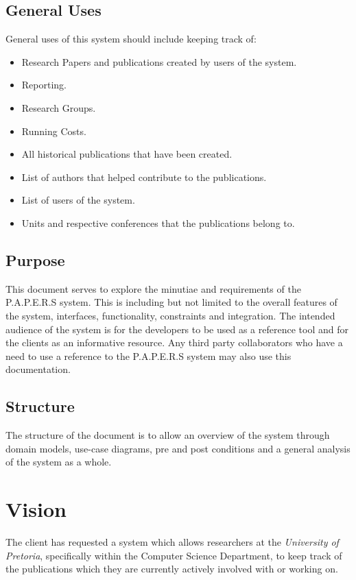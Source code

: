 \documentclass{article}
\begin{document}
	\subsection{General Uses}\label{subsec:generaluses}
		General uses of this system should include keeping track of:
            \begin{itemize}  
            
                \item Research Papers and publications created by users of the system.
                \item Reporting.
                \item Research Groups.
                \item Running Costs.
                \item All historical publications that have been created.
                \item List of authors that helped contribute to the publications.
                \item List of users of the system.
                \item Units and respective conferences that the publications belong to.
            \end{itemize}
		\subsection{Purpose}\label{subsec:purpose}
			This document serves to explore the minutiae and requirements of the P.A.P.E.R.S system. This is including but not limited to the overall features of the system, interfaces, functionality, constraints and integration. The intended audience of the system is for the developers to be used as a reference tool and for the clients as an informative resource. Any third party collaborators who have a need to use a reference to the P.A.P.E.R.S system may also use this documentation.
		\subsection{Structure}\label{subsec:structure}
			The structure of the document is to allow an overview of the system through domain models, use-case diagrams, pre and post conditions and a general analysis of the system as a whole.
		
		
	\cleardoublepage	
	\section{Vision}\label{sec:vision}
		The client has requested a system which allows researchers at the \textit{University of Pretoria}, specifically within the Computer Science Department, to keep track of the publications which they are currently actively involved with or working on.
		
\end{document}
